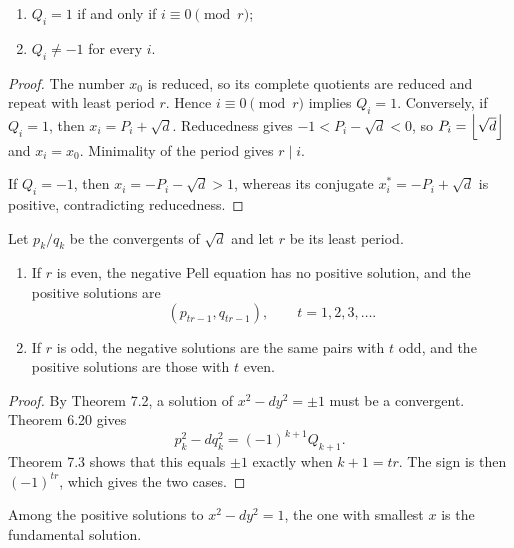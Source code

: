 \begin{thm}
\begin{enumerate}[label=(\alph*)]
\item $Q_i=1$ if and only if $i\equiv0\pmod r$;
\item $Q_i\ne-1$ for every $i$.
\end{enumerate}
\end{thm}
\begin{proof}
The number $x_0$ is reduced, so its complete quotients are reduced and repeat with least period $r$.  Hence $i\equiv0\pmod r$ implies $Q_i=1$.  Conversely, if $Q_i=1$, then
$x_i=P_i+\sqrt d$.  Reducedness gives
$-1<P_i-\sqrt d<0$, so $P_i=\left\lfloor \sqrt d \right\rfloor$ and $x_i=x_0$.  Minimality of the period gives $r\mid i$.

If $Q_i=-1$, then
$x_i=-P_i-\sqrt d>1$, whereas its conjugate $x_i^*=-P_i+\sqrt d$ is positive, contradicting reducedness.
\end{proof}

\begin{thm}
Let $p_k/q_k$ be the convergents of $\sqrt d$ and let $r$ be its least period.
\begin{enumerate}[label=(\alph*)]
\item If $r$ is even, the negative Pell equation has no positive solution, and the positive solutions are
\[
 (p_{tr-1},q_{tr-1}),\qquad t=1,2,3,\ldots.
\]
\item If $r$ is odd, the negative solutions are the same pairs with $t$ odd, and the positive solutions are those with $t$ even.
\end{enumerate}
\end{thm}
\begin{proof}
By Theorem 7.2, a solution of $x^2-dy^2=\pm1$ must be a convergent.  Theorem 6.20 gives
\[
 p_k^2-dq_k^2=(-1)^{k+1}Q_{k+1}.
\]
Theorem 7.3 shows that this equals $\pm1$ exactly when $k+1=tr$.  The sign is then $(-1)^{tr}$, which gives the two cases.
\end{proof}

\begin{de}
Among the positive solutions to $x^2-dy^2=1$, the one with smallest $x$ is the fundamental solution.
\end{de}

